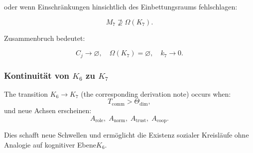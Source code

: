 oder wenn Einschränkungen hinsichtlich des Einbettungsraums fehlschlagen:

\[
 M_7 \not\supseteq \Omega(K_7).
\]

Zusammenbruch bedeutet:

\[
 C_j \to \varnothing,\quad
 \Omega(K_7)=\varnothing,\quad
 k_7\to 0.
\]

\subsubsection{Kontinuität von \texorpdfstring{$K_6$}{K_6} zu \texorpdfstring{$K_7$}{K_7}}

The transition $K_6\to K_7$ (the corresponding derivation note) occurs when:
\[
  T_{\mathrm{comm}} > \Theta_{\mathrm{dim}},
\]
und neue Achsen erscheinen:
\[
  A_{\mathrm{role}},\;
  A_{\mathrm{norm}},\;
  A_{\mathrm{trust}},\;
  A_{\mathrm{coop}}.
\]

Dies schafft neue Schwellen und ermöglicht die Existenz sozialer Kreisläufe
ohne Analogie auf kognitiver Ebene$K_6$.
